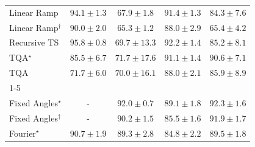 \begin{tabular}{l|cccc|}
Linear Ramp & {\cellcolor[HTML]{7B2B05}} \color[HTML]{F1F1F1} $94.1\pm 1.3$ & {\cellcolor[HTML]{FEC550}} \color[HTML]{000000} $67.9\pm 1.8$ & {\cellcolor[HTML]{933204}} \color[HTML]{F1F1F1} $91.4\pm 1.3$ & {\cellcolor[HTML]{D05104}} \color[HTML]{F1F1F1} $84.3\pm 7.6$ \\
Linear Ramp$^\dagger$ & {\cellcolor[HTML]{A03704}} \color[HTML]{F1F1F1} $90.0\pm 2.0$ & {\cellcolor[HTML]{FED36F}} \color[HTML]{000000} $65.3\pm 1.2$ & {\cellcolor[HTML]{B13F03}} \color[HTML]{F1F1F1} $88.0\pm 2.9$ & {\cellcolor[HTML]{FED26D}} \color[HTML]{000000} $65.4\pm 4.2$ \\
Recursive TS & {\cellcolor[HTML]{6B2606}} \color[HTML]{F1F1F1} $95.8\pm 0.8$ & {\cellcolor[HTML]{FEB744}} \color[HTML]{000000} $69.7\pm 13.3$ & {\cellcolor[HTML]{8C3004}} \color[HTML]{F1F1F1} $92.2\pm 1.4$ & {\cellcolor[HTML]{CB4B02}} \color[HTML]{F1F1F1} $85.2\pm 8.1$ \\
TQA$^\star$ & {\cellcolor[HTML]{C84A02}} \color[HTML]{F1F1F1} $85.5\pm 6.7$ & {\cellcolor[HTML]{FEA937}} \color[HTML]{000000} $71.7\pm 17.6$ & {\cellcolor[HTML]{963304}} \color[HTML]{F1F1F1} $91.1\pm 1.4$ & {\cellcolor[HTML]{9B3504}} \color[HTML]{F1F1F1} $90.6\pm 7.1$ \\
TQA & {\cellcolor[HTML]{FEA937}} \color[HTML]{000000} $71.7\pm 6.0$ & {\cellcolor[HTML]{FEB541}} \color[HTML]{000000} $70.0\pm 16.1$ & {\cellcolor[HTML]{B13F03}} \color[HTML]{F1F1F1} $88.0\pm 2.1$ & {\cellcolor[HTML]{C44802}} \color[HTML]{F1F1F1} $85.9\pm 8.9$ \\
\cline{1-5}
\multicolumn{5}{c}{\rule{0pt}{8pt}PP} \\
\midrule
Fixed Angles$^\star$ & {\cellcolor[HTML]{000000}} \color[HTML]{F1F1F1} {\cellcolor{white}} \color{black} - & {\cellcolor[HTML]{006034}} \color[HTML]{F1F1F1} $92.0\pm 0.7$ & {\cellcolor[HTML]{0A703A}} \color[HTML]{F1F1F1} $89.1\pm 1.8$ & {\cellcolor[HTML]{005E33}} \color[HTML]{F1F1F1} $92.3\pm 1.6$ \\
Fixed Angles$^\dagger$ & {\cellcolor[HTML]{000000}} \color[HTML]{F1F1F1} {\cellcolor{white}} \color{black} - & {\cellcolor[HTML]{036B38}} \color[HTML]{F1F1F1} $90.2\pm 1.5$ & {\cellcolor[HTML]{208242}} \color[HTML]{F1F1F1} $85.5\pm 1.6$ & {\cellcolor[HTML]{006034}} \color[HTML]{F1F1F1} $91.9\pm 1.7$ \\
Fourier$^\star$ & {\cellcolor[HTML]{006837}} \color[HTML]{F1F1F1} $90.7\pm 1.9$ & {\cellcolor[HTML]{096F3A}} \color[HTML]{F1F1F1} $89.3\pm 2.8$ & {\cellcolor[HTML]{248644}} \color[HTML]{F1F1F1} $84.8\pm 2.2$ & {\cellcolor[HTML]{086E3A}} \color[HTML]{F1F1F1} $89.5\pm 1.8$ \\

\end{tabular}
